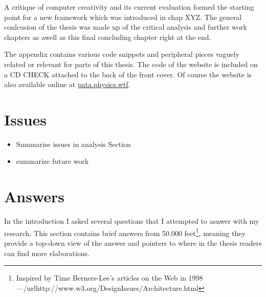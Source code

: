 A critique of computer creativity and its current evaluation formed the starting point for a new framework which was introduced in chap XYZ. The general conlcusion of the thesis was made up of the critical analysis and further work chapters as awell as this final concluding chapter right at the end.

The appendix contains various code snippets and peripheral pieces vaguely related or relevant for parts of this thesis. The code of the website is included on a CD CHECK attached to the back of the front cover. Of course the website is also available online at \url{pata.physics.wtf}.



\section{Issues}

\begin{itemize}
  \item Summarise issues in analysis Section
  \item summarize future work
\end{itemize}


\section{Answers}
\label{s:answers}

In the introduction I asked several questions that I attempted to asnwer with my research. This section contains brief answers from 50.000 feet\footnote{Inspired by Time Berners-Lee's articles on the Web in 1998---/url{http://www.w3.org/DesignIssues/Architecture.html}}, meaning they provide a top-down view of the answer and pointers to where in the thesis readers can find more elaborations.

